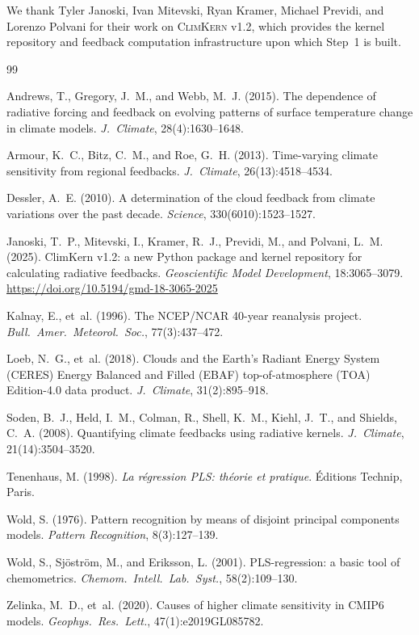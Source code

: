 \documentclass[11pt]{article}
\newcommand{\oldsystem}{\textsc{ClimKern}}
\begin{document}
We thank Tyler Janoski, Ivan Mitevski, Ryan Kramer, Michael
Previdi, and Lorenzo Polvani for their work on \oldsystem{} v1.2,
which provides the kernel repository and feedback computation
infrastructure upon which Step~1 is built.

\begin{thebibliography}{99}

Andrews, T., Gregory, J.~M., and Webb, M.~J. (2015).
The dependence of radiative forcing and feedback on evolving
patterns of surface temperature change in climate models.
\textit{J.~Climate}, 28(4):1630--1648.

Armour, K.~C., Bitz, C.~M., and Roe, G.~H. (2013).
Time-varying climate sensitivity from regional feedbacks.
\textit{J.~Climate}, 26(13):4518--4534.

Dessler, A.~E. (2010).
A determination of the cloud feedback from climate variations over
the past decade.
\textit{Science}, 330(6010):1523--1527.

Janoski, T.~P., Mitevski, I., Kramer, R.~J., Previdi, M., and
Polvani, L.~M. (2025).
ClimKern v1.2: a new Python package and kernel repository for
calculating radiative feedbacks.
\textit{Geoscientific Model Development}, 18:3065--3079.
\url{https://doi.org/10.5194/gmd-18-3065-2025}

Kalnay, E., et~al. (1996).
The NCEP/NCAR 40-year reanalysis project.
\textit{Bull.~Amer.~Meteorol.~Soc.}, 77(3):437--472.

Loeb, N.~G., et~al. (2018).
Clouds and the Earth's Radiant Energy System (CERES) Energy
Balanced and Filled (EBAF) top-of-atmosphere (TOA) Edition-4.0
data product.
\textit{J.~Climate}, 31(2):895--918.

Soden, B.~J., Held, I.~M., Colman, R., Shell, K.~M., Kiehl,
J.~T., and Shields, C.~A. (2008).
Quantifying climate feedbacks using radiative kernels.
\textit{J.~Climate}, 21(14):3504--3520.

Tenenhaus, M. (1998).
\textit{La r\'{e}gression PLS: th\'{e}orie et pratique}.
\'{E}ditions Technip, Paris.

Wold, S. (1976).
Pattern recognition by means of disjoint principal components
models.
\textit{Pattern Recognition}, 8(3):127--139.

Wold, S., Sj\"{o}str\"{o}m, M., and Eriksson, L. (2001).
PLS-regression: a basic tool of chemometrics.
\textit{Chemom.~Intell.~Lab.~Syst.}, 58(2):109--130.

Zelinka, M.~D., et~al. (2020).
Causes of higher climate sensitivity in CMIP6 models.
\textit{Geophys.~Res.~Lett.}, 47(1):e2019GL085782.

\end{thebibliography}
\end{document}

